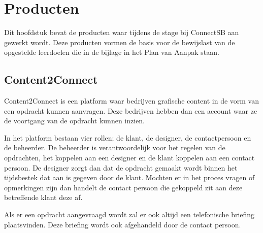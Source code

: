 \section{Producten}
Dit hoofdstuk bevat de producten waar tijdens de stage bij ConnectSB aan gewerkt wordt. Deze producten vormen de basis voor de bewijslast van de opgestelde leerdoelen die in de bijlage in het Plan van Aanpak staan.

\subsection{Content2Connect}
Content2Connect is een platform waar bedrijven grafische content in de vorm van een opdracht kunnen aanvragen. Deze bedrijven hebben dan een account waar ze de voortgang van de opdracht kunnen inzien.

In het platform bestaan vier rollen; de klant, de designer, de contactpersoon en de beheerder. De beheerder is verantwoordelijk voor het regelen van de opdrachten, het koppelen aan een designer en de klant koppelen aan een contact persoon. De designer zorgt dan dat de opdracht gemaakt wordt binnen het tijdsbestek dat aan is gegeven door de klant. Mochten er in het proces vragen of opmerkingen zijn dan handelt de contact persoon die gekoppeld zit aan deze betreffende klant deze af.

Als er een opdracht aangevraagd wordt zal er ook altijd een telefonische briefing plaatsvinden. Deze briefing wordt ook afgehandeld door de contact persoon.

\clearpage